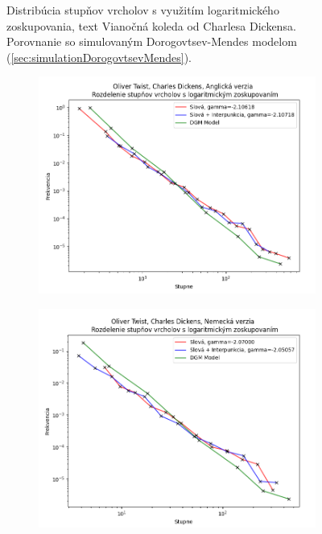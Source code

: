 \begin{figure}[htbp]
    \vspace{0.3cm}
    \caption{Distribúcia stupňov vrcholov s využitím logaritmického zoskupovania, text Vianočná koleda od Charlesa Dickensa. Porovnanie so simulovaným Dorogovtsev-Mendes modelom (\ref{sec:simulationDorogovtsevMendes}).}\label{fig:lbdegdistKoleda}
\end{figure}

\begin{figure}[htbp]
    \centering
    \begin{subfigure}[b]{0.9\textwidth}
        \includegraphics[width=\textwidth]{images/lbdegdist/Screenshot_5.png}
    \end{subfigure}

    \vspace{0.3cm}

    \begin{subfigure}[b]{0.9\textwidth}
        \includegraphics[width=\textwidth]{images/lbdegdist/Screenshot_6.png}
    \end{subfigure}
    

\end{figure}
